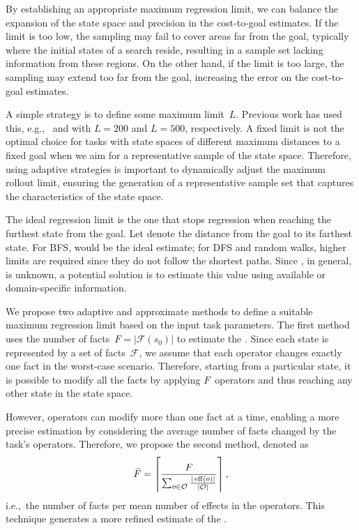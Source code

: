 By establishing an appropriate maximum regression limit, we can balance the expansion of the state space and precision in the cost-to-goal estimates. If the limit is too low, the sampling may fail to cover areas far from the goal, typically where the initial states of a search reside, resulting in a sample set lacking information from these regions. On the other hand, if the limit is too large, the sampling may extend too far from the goal, increasing the error on the cost-to-goal estimates.

A simple strategy is to define some maximum limit~$L$. Previous work has used this, e.g.,~\citet{yu2020learning} and \citet{otoole2022sampling} with $L=200$ and $L=500$, respectively. A fixed limit is not the optimal choice for tasks with state spaces of different maximum distances to a fixed goal when we aim for a representative sample of the state space. Therefore, using adaptive strategies is important to dynamically adjust the maximum rollout limit, ensuring the generation of a representative sample set that captures the characteristics of the state space.

The ideal regression limit is the one that stops regression when reaching the furthest state from the goal. Let \ssdiameter denote the distance from the goal to its farthest state. For BFS, \ssdiameter would be the ideal estimate; for DFS and random walks, higher limits are required since they do not follow the shortest paths. Since \ssdiameter, in general, is unknown, a potential solution is to estimate this value using available or domain-specific information.

We propose two adaptive and approximate methods to define a suitable maximum regression limit based on the input task parameters. The first method uses the number of facts~$F = |\mathcal{F}(s_0)|$ to estimate the \ssdiameter. Since each state is represented by a set of facts~$\mathcal{F}$, we assume that each operator changes exactly one fact in the worst-case scenario. Therefore, starting from a particular state, it is possible to modify all the facts by applying $F$~operators and thus reaching any other state in the state space.

However, operators can modify more than one fact at a time, enabling a more precise estimation by considering the average number of facts changed by the task's operators. Therefore, we propose the second method, denoted as~$$\bar F=\left\lceil \frac{F}{\sum_{o\in \mathcal{O}} \frac{|\operatorname{eff}(o)|}{|\mathcal{O}|}}\right\rceil,$$ i.e.,~the number of facts per mean number of effects in the operators. This technique generates a more refined estimate of the \ssdiameter.

